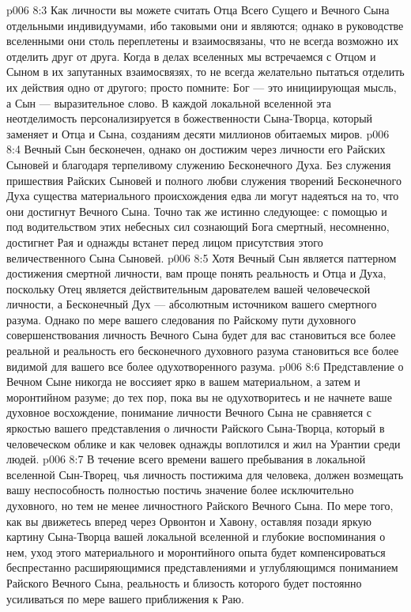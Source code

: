 \vs p006 8:3 Как личности вы можете считать Отца Всего Сущего и Вечного Сына отдельными индивидуумами, ибо таковыми они и являются; однако в руководстве вселенными они столь переплетены и взаимосвязаны, что не всегда возможно их отделить друг от друга. Когда в делах вселенных мы встречаемся с Отцом и Сыном в их запутанных взаимосвязях, то не всегда желательно пытаться отделить их действия одно от другого; просто помните: Бог --- это инициирующая мысль, а Сын --- выразительное слово. В каждой локальной вселенной эта неотделимость персонализируется в божественности Сына\hyp{}Творца, который заменяет и Отца и Сына, созданиям десяти миллионов обитаемых миров.
\vs p006 8:4 Вечный Сын бесконечен, однако он достижим через личности его Райских Сыновей и благодаря терпеливому служению Бесконечного Духа. Без служения пришествия Райских Сыновей и полного любви служения творений Бесконечного Духа существа материального происхождения едва ли могут надеяться на то, что они достигнут Вечного Сына. Точно так же истинно следующее: с помощью и под водительством этих небесных сил сознающий Бога смертный, несомненно, достигнет Рая и однажды встанет перед лицом присутствия этого величественного Сына Сыновей.
\vs p006 8:5 \pc Хотя Вечный Сын является паттерном достижения смертной личности, вам проще понять реальность и Отца и Духа, поскольку Отец является действительным дарователем вашей человеческой личности, а Бесконечный Дух --- абсолютным источником вашего смертного разума. Однако по мере вашего следования по Райскому пути духовного совершенствования личность Вечного Сына будет для вас становиться все более реальной и реальность его бесконечного духовного разума становиться все более видимой для вашего все более одухотворенного разума.
\vs p006 8:6 Представление о Вечном Сыне никогда не воссияет ярко в вашем материальном, а затем и моронтийном разуме; до тех пор, пока вы не одухотворитесь и не начнете ваше духовное восхождение, понимание личности Вечного Сына не сравняется с яркостью вашего представления о личности Райского Сына\hyp{}Творца, который в человеческом облике и как человек однажды воплотился и жил на Урантии среди людей.
\vs p006 8:7 В течение всего времени вашего пребывания в локальной вселенной Сын\hyp{}Творец, чья личность постижима для человека, должен возмещать вашу неспособность полностью постичь значение более исключительно духовного, но тем не менее личностного Райского Вечного Сына. По мере того, как вы движетесь вперед через Орвонтон и Хавону, оставляя позади яркую картину Сына\hyp{}Творца вашей локальной вселенной и глубокие воспоминания о нем, уход этого материального и моронтийного опыта будет компенсироваться беспрестанно расширяющимися представлениями и углубляющимся пониманием Райского Вечного Сына, реальность и близость которого будет постоянно усиливаться по мере вашего приближения к Раю.
